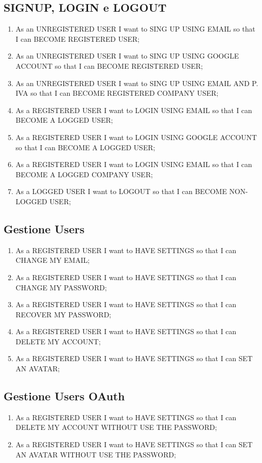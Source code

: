 \documentclass[11pt]{article}
\begin{document}
\subsection{SIGNUP, LOGIN e LOGOUT}
\begin{enumerate}
	\item As an UNREGISTERED USER I want to SING UP USING EMAIL so that I can BECOME REGISTERED USER;
	\item As an UNREGISTERED USER I want to SING UP USING GOOGLE ACCOUNT so that I can BECOME REGISTERED USER;
	\item As an UNREGISTERED USER I want to SING UP USING EMAIL AND P. IVA so that I can BECOME REGISTERED COMPANY USER;
	\item As a REGISTERED USER I want to LOGIN USING EMAIL so that I can BECOME A LOGGED USER;
	\item As a REGISTERED USER I want to LOGIN USING GOOGLE ACCOUNT so that I can BECOME A LOGGED USER;
	\item As a REGISTERED USER I want to LOGIN USING EMAIL so that I can BECOME A LOGGED COMPANY USER;
	\item As a LOGGED USER I want to LOGOUT so that I can BECOME NON-LOGGED USER;
\end{enumerate}

\subsection{Gestione Users}
\begin{enumerate}
	\item As a REGISTERED USER I want to HAVE SETTINGS so that I can CHANGE MY EMAIL;
	\item As a REGISTERED USER I want to HAVE SETTINGS so that I can CHANGE MY PASSWORD;
	\item As a REGISTERED USER I want to HAVE SETTINGS so that I can RECOVER MY PASSWORD;
	\item As a REGISTERED USER I want to HAVE SETTINGS so that I can DELETE MY ACCOUNT;
	\item As a REGISTERED USER I want to HAVE SETTINGS so that I can SET AN AVATAR;
\end{enumerate}

\subsection{Gestione Users OAuth}
\begin{enumerate}
	\item As a REGISTERED USER I want to HAVE SETTINGS so that I can DELETE MY ACCOUNT WITHOUT USE THE PASSWORD;
	\item As a REGISTERED USER I want to HAVE SETTINGS so that I can SET AN AVATAR WITHOUT USE THE PASSWORD;
\end{enumerate}
\end{document}

